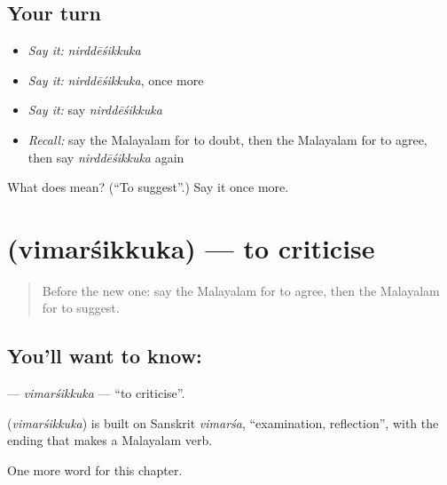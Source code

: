 \subsection*{Your turn}
\begin{itemize}
\raggedright
  \item \emph{Say it:} \emph{nirddēśikkuka}
  \item \emph{Say it:} \emph{nirddēśikkuka}, once more
  \item \emph{Say it:} say \emph{nirddēśikkuka}
  \item \emph{Recall:} say the Malayalam for to doubt, then the Malayalam for to agree, then say \emph{nirddēśikkuka} again
\end{itemize}

\begin{tcolorbox}[breakable,colback=teal!4,colframe=teal!35!black,title={Before you move on}]
What does  mean? (\textquotedblleft{}To suggest\textquotedblright{}.) Say it once more.
\end{tcolorbox}
\section[\texorpdfstring{\ml{വിമർശിക്കുക} (vimarśikkuka)}{വിമർശിക്കുക (vimarśikkuka)}]{ (vimarśikkuka) — to criticise}

\label{lesson:ML-C230-vimarsikkuka}



\begin{quote}
Before the new one: say the Malayalam for to agree, then the Malayalam for to suggest.
\end{quote}

\subsection*{You'll want to know: }
\textbf{} — \emph{vimarśikkuka} — \textquotedblleft{}to criticise\textquotedblright{}.

\begin{cousinweb}
\textbf{} (\emph{vimarśikkuka}) is built on Sanskrit \emph{vimarśa}, \textquotedblleft{}examination, reflection\textquotedblright{}, with the ending that makes a Malayalam verb.
\end{cousinweb}

\begin{grammarlens}[title={What you've built}]
One more word for this chapter.
\end{grammarlens}

